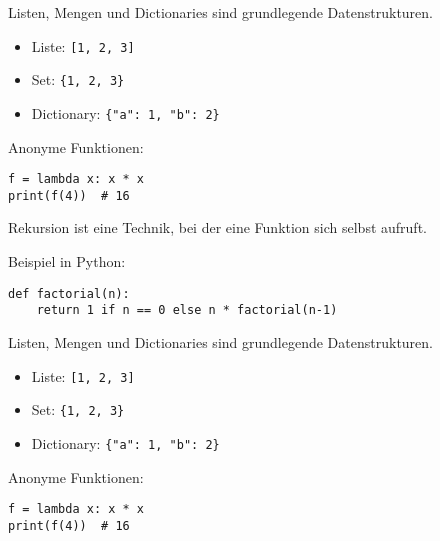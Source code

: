 \documentclass[
]{article}
\providecommand{\tightlist}{%
  \setlength{\itemsep}{0pt}\setlength{\parskip}{0pt}}\usepackage{longtable,booktabs,array}
\newenvironment{cheatboxparacol}{\par\vspace{2pt}\noindent\begin{tcolorbox}[enhanced, sharp corners, colback=gray!5]}{\end{tcolorbox}\vspace{2pt}}
\begin{document}
\begin{cheatboxparacol}

Listen, Mengen und Dictionaries sind grundlegende Datenstrukturen.

\begin{itemize}
\tightlist
\item
  Liste: \texttt{{[}1,\ 2,\ 3{]}}
\item
  Set: \texttt{\{1,\ 2,\ 3\}}
\item
  Dictionary: \texttt{\{"a":\ 1,\ "b":\ 2\}}
\end{itemize}

\end{cheatboxparacol}

\begin{cheatboxparacol}

Anonyme Funktionen:

\begin{verbatim}
f = lambda x: x * x
print(f(4))  # 16
\end{verbatim}

\end{cheatboxparacol}

\begin{cheatboxparacol}

Rekursion ist eine Technik, bei der eine Funktion sich selbst aufruft.

Beispiel in Python:

\begin{verbatim}
def factorial(n):
    return 1 if n == 0 else n * factorial(n-1)
\end{verbatim}

\end{cheatboxparacol}

\begin{cheatboxparacol}

Listen, Mengen und Dictionaries sind grundlegende Datenstrukturen.

\begin{itemize}
\tightlist
\item
  Liste: \texttt{{[}1,\ 2,\ 3{]}}
\item
  Set: \texttt{\{1,\ 2,\ 3\}}
\item
  Dictionary: \texttt{\{"a":\ 1,\ "b":\ 2\}}
\end{itemize}

\end{cheatboxparacol}

\begin{cheatboxparacol}

Anonyme Funktionen:

\begin{verbatim}
f = lambda x: x * x
print(f(4))  # 16
\end{verbatim}

\end{cheatboxparacol}
\end{document}
